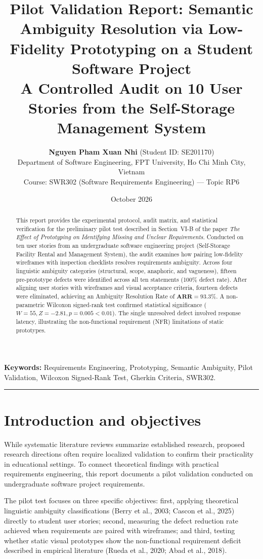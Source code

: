 \documentclass[11pt,a4paper]{article}
\title{\textbf{Pilot Validation Report: Semantic Ambiguity Resolution via Low-Fidelity Prototyping on a Student Software Project}\\
\large A Controlled Audit on 10 User Stories from the Self-Storage Management System}
\author{\textbf{Nguyen Pham Xuan Nhi} (Student ID: SE201170) \\
Department of Software Engineering, FPT University, Ho Chi Minh City, Vietnam \\
Course: SWR302 (Software Requirements Engineering) --- Topic RP6}
\date{October 2026}
\begin{document}
\maketitle

\begin{abstract}
This report provides the experimental protocol, audit matrix, and statistical verification for the preliminary pilot test described in Section~VI-B of the paper \textit{The Effect of Prototyping on Identifying Missing and Unclear Requirements}. Conducted on ten user stories from an undergraduate software engineering project (Self-Storage Facility Rental and Management System), the audit examines how pairing low-fidelity wireframes with inspection checklists resolves requirements ambiguity. Across four linguistic ambiguity categories (structural, scope, anaphoric, and vagueness), fifteen pre-prototype defects were identified across all ten statements (100\% defect rate). After aligning user stories with wireframes and visual acceptance criteria, fourteen defects were eliminated, achieving an Ambiguity Resolution Rate of $\mathbf{ARR = 93.3\%}$. A non-parametric Wilcoxon signed-rank test confirmed statistical significance ($W = 55, Z = -2.81, p = 0.005 < 0.01$). The single unresolved defect involved response latency, illustrating the non-functional requirement (NFR) limitations of static prototypes.
\end{abstract}

\vspace{0.5em}
\noindent\textbf{Keywords:} Requirements Engineering, Prototyping, Semantic Ambiguity, Pilot Validation, Wilcoxon Signed-Rank Test, Gherkin Criteria, SWR302.

\vspace{1em}
\hrule
\vspace{1em}

\section{Introduction and objectives}

While systematic literature reviews summarize established research, proposed research directions often require localized validation to confirm their practicality in educational settings. To connect theoretical findings with practical requirements engineering, this report documents a pilot validation conducted on undergraduate software project requirements.

The pilot test focuses on three specific objectives: first, applying theoretical linguistic ambiguity classifications (Berry et al., 2003; Cascon et al., 2025) directly to student user stories; second, measuring the defect reduction rate achieved when requirements are paired with wireframes; and third, testing whether static visual prototypes show the non-functional requirement deficit described in empirical literature (Rueda et al., 2020; Abad et al., 2018).
\end{document}
